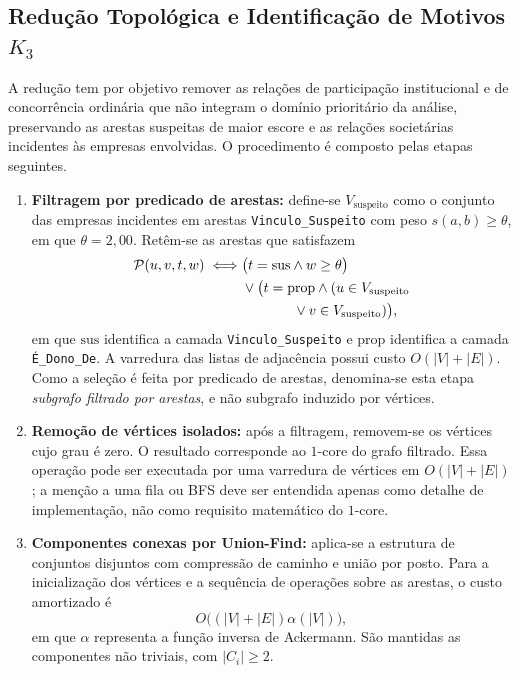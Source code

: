 \subsection{Redução Topológica e Identificação de Motivos $K_3$}

A redução tem por objetivo remover as relações de participação institucional e de concorrência ordinária que não integram o domínio prioritário da análise, preservando as arestas suspeitas de maior escore e as relações societárias incidentes às empresas envolvidas. O procedimento é composto pelas etapas seguintes.

\begin{enumerate}
  \item \textbf{Filtragem por predicado de arestas:} define-se $V_{\mathrm{suspeito}}$ como o conjunto das empresas incidentes em arestas \texttt{Vinculo\_Suspeito} com peso $s(a,b)\geq\theta$, em que $\theta=2{,}00$. Retêm-se as arestas que satisfazem
  \begin{equation}
  \begin{aligned}
  \mathcal{P}(u,v,t,w)\iff&
  \big(t=\mathrm{sus}\land w\geq\theta\big)\\
  &\lor\big(t=\mathrm{prop}\land
  (u\in V_{\mathrm{suspeito}}\\
  &\hspace{3.7em}\lor v\in V_{\mathrm{suspeito}})\big),
  \end{aligned}
  \label{eq:predicado_reducao}
  \end{equation}
  em que $\mathrm{sus}$ identifica a camada \texttt{Vinculo\_Suspeito} e $\mathrm{prop}$ identifica a camada \texttt{É\_Dono\_De}.
  A varredura das listas de adjacência possui custo $O(|V|+|E|)$. Como a seleção é feita por predicado de arestas, denomina-se esta etapa \textit{subgrafo filtrado por arestas}, e não subgrafo induzido por vértices.

  \item \textbf{Remoção de vértices isolados:} após a filtragem, removem-se os vértices cujo grau é zero. O resultado corresponde ao $1$-core do grafo filtrado. Essa operação pode ser executada por uma varredura de vértices em $O(|V|+|E|)$; a menção a uma fila ou BFS deve ser entendida apenas como detalhe de implementação, não como requisito matemático do $1$-core.

  \item \textbf{Componentes conexas por Union-Find:} aplica-se a estrutura de conjuntos disjuntos com compressão de caminho e união por posto. Para a inicialização dos vértices e a sequência de operações sobre as arestas, o custo amortizado é
  \begin{equation}
    O\big((|V|+|E|)\alpha(|V|)\big),
  \end{equation}
  em que $\alpha$ representa a função inversa de Ackermann. São mantidas as componentes não triviais, com $|C_i|\geq2$.


\end{enumerate}
